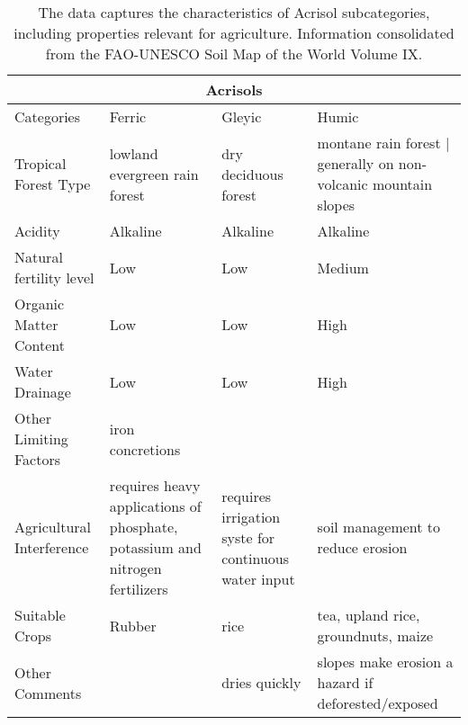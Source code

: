 \begin{table}
  \caption{The data captures the characteristics of Acrisol subcategories, including properties relevant for agriculture. Information consolidated from the FAO-UNESCO Soil Map of the World Volume IX.}
\begin{center}
  \begin{tabular}{ | p{3.5cm} | p{3.5cm} | p{3.5cm} | p{3.5cm} |}
    \hline
    \multicolumn{4}{|c|}{Acrisols} \\
    \hline
    Categories & Ferric & Gleyic & Humic \\ \hline
    Tropical Forest Type & lowland evergreen rain forest & dry deciduous forest & montane rain forest | generally on non-volcanic mountain slopes\\ \hline
    Acidity & Alkaline & Alkaline &  Alkaline \\ \hline
    Natural fertility level & Low & Low & Medium \\ \hline
    Organic Matter Content & Low & Low & High \\ \hline
    Water Drainage & Low & Low & High \\ \hline
    Other Limiting Factors & iron concretions & &\\ \hline
    Agricultural Interference & requires heavy applications of phosphate, potassium and nitrogen fertilizers & requires irrigation syste for continuous water input & soil management to reduce erosion\\ \hline
    Suitable Crops & Rubber & rice & tea, upland rice, groundnuts, maize \\ \hline
    Other Comments & & dries quickly & slopes make erosion a hazard if deforested/exposed\\ 
    \hline
    \end{tabular}
		\end{center}
\end{table}
 
